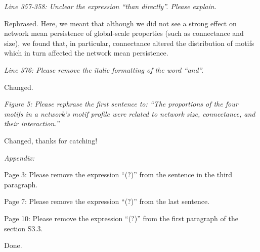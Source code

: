 \documentclass[12pt]{article}
\newcommand{\us}{\rm \setlength{\leftskip}{0.3cm} \setlength{\rightskip}{0.3cm}}
\newcommand{\them}{\it \setlength{\leftskip}{0cm} \setlength{\rightskip}{0cm}}
\begin{document}
        \them
        Line 357-358: Unclear the expression “than directly”. Please explain.
        
        \us
        Rephrased. Here, we meant that although we did not see a strong effect on network mean persistence of global-scale properties (such as connectance and size), we found that, in particular, connectance altered the distribution of motifs which in turn affected the network mean persistence.  
        
        \them
        Line 376: Please remove the italic formatting of the word “and”.
        
        \us
        Changed.
        
        \them
        Figure 5: Please rephrase the first sentence to: “The proportions of the four motifs in a network's motif profile were related to network size, connectance, and their interaction.”
        
        \us
        Changed, thanks for catching!
        
        \them
        Appendix:
        
        Page 3: Please remove the expression “(?)” from the sentence in the third paragraph.
        
        Page 7: Please remove the expression “(?)” from the last sentence.
        
        Page 10: Please remove the expression “(?)” from the first paragraph of the section S3.3.
        
        \us
        Done.
\end{document}
